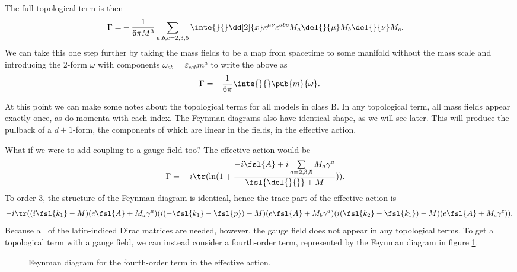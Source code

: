 The full topological term is then
\begin{align*}
	\Gamma =& -\frac{1}{6\pi M^{3}}\sum\limits_{a, b, c = 2, 3, 5}\inte{}{}\dd[2]{x}\varepsilon^{\mu\nu}\varepsilon^{abc}M_{a}\del{}{\mu}M_{b}\del{}{\nu}M_{c}.
\end{align*}
We can take this one step further by taking the mass fields to be a map from spacetime to some manifold without the mass scale and introducing the 2-form $\omega$ with components $\omega_{ab} = \varepsilon_{cab}m^{a}$ to write the above as
\begin{align*}
	\Gamma = -\frac{1}{6\pi}\inte{}{}\pub{m}{\omega}.
\end{align*}

At this point we can make some notes about the topological terms for all models in class B. In any topological term, all mass fields appear exactly once, as do momenta with each index. The Feynman diagrams also have identical shape, as we will see later. This will produce the pullback of a $d + 1$-form, the components of which are linear in the fields, in the effective action.

What if we were to add coupling to a gauge field too? The effective action would be
\begin{align*}
	\Gamma =& -i\tr(\ln(1 + \frac{-i\fsl{A} + i\sum\limits_{a = 2, 3, 5}M_{a}\gamma^{a}}{\fsl{\del{}{}} + M})).
\end{align*}
To order $3$, the structure of the Feynman diagram is identical, hence the trace part of the effective action is
\begin{align*}
	-i\tr((i\fsl{k_{1}} - M)(e\fsl{A} + M_{a}\gamma^{a})(i(-\fsl{k_{1}} - \fsl{p}) - M)(e\fsl{A} + M_{b}\gamma^{a})(i(\fsl{k_{2}} - \fsl{k_{1}}) - M)(e\fsl{A} + M_{c}\gamma^{c})).
\end{align*}
Because all of the latin-indiced Dirac matrices are needed, however, the gauge field does not appear in any topological terms. To get a topological term with a gauge field, we can instead consider a fourth-order term, represented by the Feynman diagram in figure \ref{fig:fourth_order_1d_fd}.

\begin{figure}[!ht]
	\centering
	\caption{Feynman diagram for the fourth-order term in the effective action.}
	\label{fig:fourth_order_1d_fd}
\end{figure}

